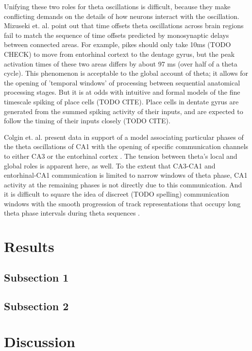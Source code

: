 \documentclass[10pt]{article}
\begin{document}
Unifying these two roles for theta oscillations is difficult, because they make conflicting demands on the details of how neurons interact with the oscillation.  Mizuseki et. al. \cite{Mizuseki2009} point out that time offsets theta oscillations across brain regions fail to match the sequence  of time offsets predicted by monosynaptic delays between connected areas.  For example, pikes should only take 10ms (TODO CHECK) to move from entorhinal cortext to the dentage gyrus, but the peak activation times of these two areas differs by about 97 ms (over half of a theta cycle).  This phenomenon is acceptable to the global account of theta; it allows for the opening of 'temporal windows' of processing between sequential anatomical processing stages.  But it is at odds with intuitive and formal models of the fine timescale spiking of place cells (TODO CITE).  Place cells in dentate gyrus are generated from the summed spiking activity of their inputs, and are expected to follow the timing of their inputs closely (TODO CITE).

Colgin et. al. present data in support of a model associating particular phases of the theta oscillations of CA1 with the opening of specific communication channels to either CA3 or the entorhinal cortex \cite{Colgin2009}.  The tension between theta's local and global roles is apparent here, as well. To the extent that CA3-CA1 and entorhinal-CA1 communication is limited to narrow windows of theta phase, CA1 activity at the remaining phases is not directly due to this communication. And it is difficult to square the idea of discreet (TODO spelling) communication windows with the smooth progression of track representations that occupy long theta phase intervals during theta sequences \cite{Foster TODO}.

\section*{Results}

\subsection*{Subsection 1}

\subsection*{Subsection 2}

\section*{Discussion}
\end{document}
